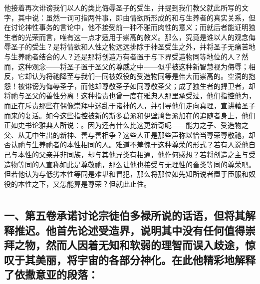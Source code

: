 他接着再次诽谤我们以人的类比侮辱圣子的受生，并提到我们教父就此所写的文字，其中说：虽然一词可指两件事，即由情欲所形成的和与生养者的真实关系，但在讨论神性事务的言论中，他不接受前一种不雅而肉性的意义；而就后者能证明独生者的光荣而言，唯有这一点才适用于崇高的教义。那么，究竟是谁以人的观念侮辱圣子的受生？是将情欲和人性之物远远排除于神圣受生之外，并将圣子无痛苦地与生养祂者结合的人？还是那将创造万有者置于与下界受造物同等地位的人？然而，这种观念——将圣子置于圣父的尊威之中——似乎被这种新智慧视为侮辱；相反，它却认为将祂降至与我们一同被奴役的受造物同等是伟大而崇高的。空洞的抱怨！被诽谤为侮辱圣子，而他却尊敬圣子如同尊敬圣父；成了独生者的捍卫者，却将祂与圣父的善性分离！这种指责也曾一度在雅典人那里承受过，他们指控他为，而正在斥责那些在偶像崇拜中迷乱于诸神的人，并引导他们走向真理，宣讲藉圣子而来的复活。如今这些指控被新的斯多葛派和伊壁鸠鲁派加在的追随者身上，他们正如史书论雅典人所说：。因为还有什么比这更新奇呢——能力之子、受造物之父、从无中生出的新神、善与善相争？这些人正是那些声称以恰当尊荣尊敬祂，却否认祂与生养祂者的本性相同的人。难道不羞愧于这种尊荣的形式？若有人说他自己与本性的父亲并非同族，却与其他异类有相通，他作何感想？若将创造之主与受造物等同的人宣称如此是尊敬祂，那么让他也接受与无理性的畜类等同的尊荣吧。但若他认为与低劣本性等同是难堪和冒犯，那么将那位如先知所说者置于臣服和奴役的本性之下，又怎能算是尊荣？但就此止住。\par



\section{}


\subsection{一、第五卷承诺讨论宗徒伯多禄所说的话语，但将其解释推迟。他首先论述受造界，说明其中没有任何值得崇拜之物，然而人因着无知和软弱的理智而误入歧途，惊叹于其美丽，将宇宙的各部分神化。在此他精彩地解释了依撒意亚的段落：}

